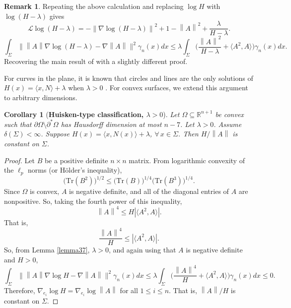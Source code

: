 \documentclass[12pt,reqno]{amsart}
\newtheorem{cor}[theorem]{Corollary}
\theoremstyle{definition}
\newtheorem{remark}[theorem]{Remark}
\renewcommand{\subset}{\subseteq}
\newcommand{\abs}[1]{\left|#1\right|}                   %
\newcommand{\vnormt}[1]{\left\|#1\right\|}    %
\newcommand{\R}{\mathbb{R}}
\newcommand{\embolden}[1]{\textbf {#1}}
\newcommand{\redA}{\partial^{*}\Omega}
\newcommand{\sdimn}{n}
\newcommand{\adimn}{n+1}
\newcommand{\scon}{\lambda}
\newcommand{\pcon}{\delta}
\begin{document}
\begin{remark}
Repeating the above calculation and replacing $\log H$ with $\log(H-\scon)$ gives
$$
\mathcal{L}\log(H-\scon)
=-\vnormt{\nabla\log (H-\scon)}^{2}+1-\vnormt{A}^{2}+\frac{\scon}{H-\scon}.
$$
$$\int_{\Sigma}\Big\|\vnormt{A}\nabla \log (H-\scon) -\nabla\vnormt{A}\Big\|^{2}\gamma_{\sdimn}(x)dx
\leq \scon\int_{\Sigma}\Big(\frac{\vnormt{A}^{2}}{H-\scon}+\langle A^{2},A\rangle\Big)\gamma_{\sdimn}(x)dx.
$$
Recovering the main result of \cite[Theorem 4.1]{cheng15} with a slightly different proof.
\end{remark}




For curves in the plane, it is known that circles and lines are the only solutions of $H(x)=\langle x,N\rangle+\scon$ when $\scon>0$ \cite[Theorem 1.5]{guang15} \cite[Theorem 1.4]{chang17}.  For convex surfaces, we extend this argument to arbitrary dimensions.


\begin{cor}[\embolden{Huisken-type classification, $\scon>0$}]\label{huisk}
Let $\Omega\subset\R^{\adimn}$ be convex such that $\partial\Omega\setminus\redA$ has Hausdorff dimension at most $\sdimn-7$.  Let $\scon>0$.  Assume $\pcon(\Sigma)<\infty$.  Suppose $H(x)=\langle x,N(x)\rangle+\scon$, $\forall\,x\in\Sigma$.  Then $H/\vnormt{A}$ is constant on $\Sigma$.
\end{cor}
\begin{proof}
Let $B$ be a positive definite $\sdimn\times\sdimn$ matrix.  From logarithmic convexity of the $\ell_{p}$ norms (or H\"{o}lder's inequality),
$$\Big(\mathrm{Tr}(B^{2})\Big)^{1/2}\leq\Big(\mathrm{Tr}(B)\Big)^{1/4}\Big(\mathrm{Tr}(B^{3})\Big)^{1/4}.$$
Since $\Omega$ is convex, $A$ is negative definite, and all of the diagonal entries of $A$ are nonpositive.  So, taking the fourth power of this inequality,
$$\vnormt{A}^{4}\leq H\abs{\langle A^{2},A\rangle}.$$
That is,
$$\frac{\vnormt{A}^{4}}{H}\leq \abs{\langle A^{2},A\rangle}.$$
So, from Lemma \ref{lemma37}, $\scon>0$, and again using that $A$ is negative definite and $H>0$,
$$\int_{\Sigma}\Big\|\vnormt{A}\nabla \log H -\nabla\vnormt{A}\Big\|^{2}\gamma_{\sdimn}(x)dx
\leq \scon\int_{\Sigma}\Big(\frac{\vnormt{A}^{4}}{H}+\langle A^{2},A\rangle\Big)\gamma_{\sdimn}(x)dx
\leq0.$$
Therefore, $\nabla_{e_{i}}\log H=\nabla_{e_{i}}\log\vnormt{A}$ for all $1\leq i\leq \sdimn$.  That is, $\vnormt{A}/H$ is constant on $\Sigma$.
\end{proof}
\end{document}
